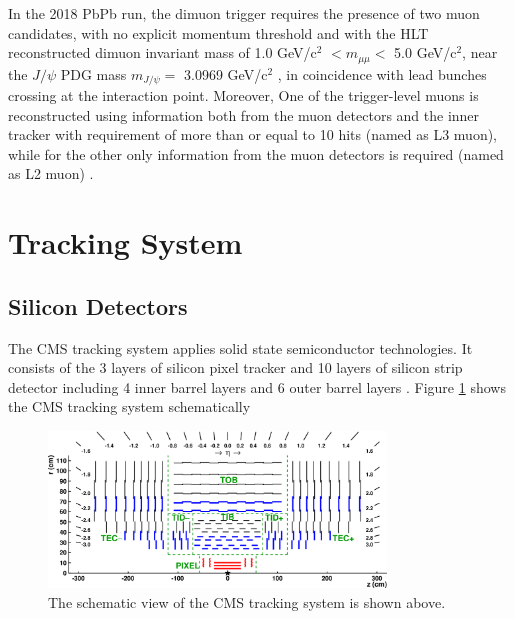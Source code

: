 In the 2018 PbPb run, the dimuon trigger requires the presence of two muon candidates, with no explicit momentum threshold and with the HLT reconstructed dimuon invariant mass of 1.0 GeV/c$^2$ $< m_{\mu\mu} <$ 5.0 GeV/c$^2$, near the $J/\psi$ PDG mass $m_{J/\psi} =$ 3.0969 GeV/c$^2$ \cite{AlphaTheoEx}, in coincidence with lead bunches crossing at the interaction point. Moreover, One of the trigger-level muons is reconstructed using information both from the muon detectors and the inner tracker with requirement of more than or equal to 10 hits (named as L3 muon), while for the other only information from the muon detectors is required (named as L2 muon) \cite{BAnaDimuonTrigger}.

\section{Tracking System}

\subsection{Silicon Detectors}

The CMS tracking system applies solid state semiconductor technologies. It consists of the 3 layers of silicon pixel tracker and 10 layers of silicon strip detector including 4 inner barrel layers and 6 outer barrel layers \cite{CMSSilicon}. Figure \ref{CMSTracker} shows the CMS tracking system schematically

\begin{figure}[hbtp]
\begin{center}
\includegraphics[width=0.80\textwidth]{Figures/Chapter2/CMSTrackingSchemtic.png}

\caption{The schematic view of the CMS tracking system is shown above.}
\label{CMSTracker}
\end{center}
\end{figure} 


